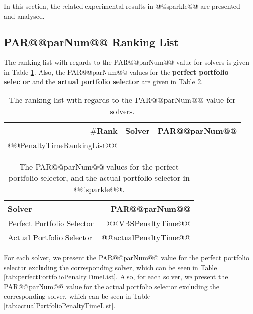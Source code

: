 \documentclass[british]{article}
\newcommand{\mytablefontsize}{9pt}
\newcommand{\mytablebaselineskip}{0.7}
\newcommand{\mytabcolsep}{5pt}
\begin{document}
In this section, the related experimental results in @@sparkle@@ are presented and analysed.

\subsection{PAR@@parNum@@ Ranking List}
\label{sec:PAR@@parNum@@_Ranking}

The ranking list with regards to the PAR@@parNum@@ value for solvers is given in Table \ref{tab:PenaltyTimeRankingList}. Also, the PAR@@parNum@@ values for the \textbf{perfect portfolio selector} and the \textbf{actual portfolio selector} are given in Table \ref{tab:PenaltyTimeForPerfectAndActual}.

\begin{table} [t]
\center
\caption{The ranking list with regards to the PAR@@parNum@@ value for solvers.}\label{tab:PenaltyTimeRankingList}
\fontsize{\mytablefontsize}{\mytablebaselineskip\baselineskip}\selectfont\setlength{\tabcolsep}{\mytabcolsep}
{
\begin{tabular}{rlr}
\hline
$\#$Rank & Solver & PAR@@parNum@@ \\
\hline
@@PenaltyTimeRankingList@@
\hline
\end{tabular}
}
\end{table}

\begin{table} [t]
\center
\caption{The PAR@@parNum@@ values for the perfect portfolio selector, and the actual portfolio selector in @@sparkle@@.}\label{tab:PenaltyTimeForPerfectAndActual}
\fontsize{\mytablefontsize}{\mytablebaselineskip\baselineskip}\selectfont\setlength{\tabcolsep}{\mytabcolsep}
{
\begin{tabular}{lr}
\hline
Solver & PAR@@parNum@@ \\
\hline
Perfect Portfolio Selector & @@VBSPenaltyTime@@ \\
Actual Portfolio Selector & @@actualPenaltyTime@@ \\
\hline
\end{tabular}
}
\end{table}

For each solver, we present the PAR@@parNum@@ value for the perfect portfolio selector excluding the corresponding solver, which can be seen in Table \ref{tab:perfectPortfolioPenaltyTimeList}. Also, for each solver, we present the PAR@@parNum@@ value for the actual portfolio selector excluding the corresponding solver, which can be seen in Table \ref{tab:actualPortfolioPenaltyTimeList}.
\end{document}
